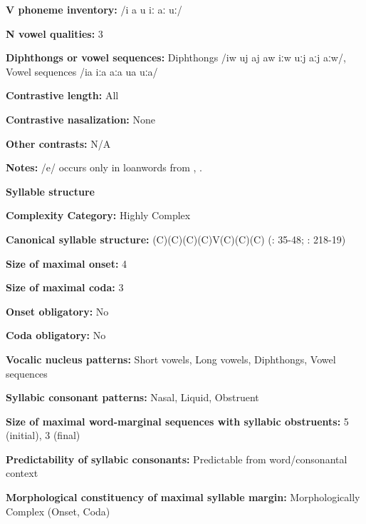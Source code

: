 \textbf{V phoneme inventory:} /i a u iː aː uː/



\textbf{N vowel qualities:} 3



\textbf{Diphthongs or vowel sequences:} Diphthongs /iw uj aj aw iːw uːj aːj aːw/, Vowel sequences /ia iːa aːa ua uːa/



\textbf{Contrastive length:} All



\textbf{Contrastive nasalization:} None



\textbf{Other contrasts:} N/A



\textbf{Notes:} /e/ occurs only in loanwords from , .



\textbf{Syllable structure}



\textbf{Complexity Category:} Highly Complex



\textbf{Canonical syllable structure:} (C)(C)(C)(C)V(C)(C)(C) (\citealt{Crawford1966}: 35-48; \citealt{Bendixen1980}: 218-19)



\textbf{Size of maximal onset:} 4



\textbf{Size of maximal coda:} 3



\textbf{Onset obligatory:} No



\textbf{Coda obligatory:} No



\textbf{Vocalic nucleus patterns:} Short vowels, Long vowels, Diphthongs, Vowel sequences



\textbf{Syllabic consonant patterns:} Nasal, Liquid, Obstruent



\textbf{Size of maximal word{}-marginal sequences with syllabic obstruents:} 5 (initial), 3 (final)



\textbf{Predictability of syllabic consonants:} Predictable from word/consonantal context



\textbf{Morphological constituency of maximal syllable margin:} Morphologically Complex (Onset, Coda)



